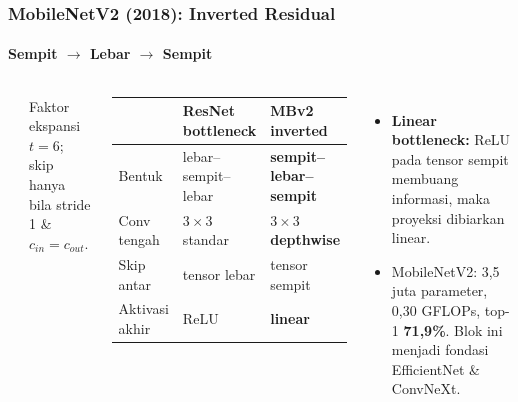 \documentclass[t,aspectratio=169,xcolor=dvipsnames]{beamer}
\begin{document}
\begin{frame}
    \frametitle{MobileNetV2 (2018): Inverted Residual}
    \framesubtitle{Sempit $\to$ Lebar $\to$ Sempit}
    \footnotesize

    \begin{columns}[T]
        \begin{center}
        \end{center}
        {\scriptsize\color{dlMute} Faktor ekspansi $t=6$; skip hanya bila stride 1 \& $c_{in}=c_{out}$.}

        \vspace{2pt}
        \begin{center}
        \scriptsize
        \begin{tabular}{lll}
            \toprule
             & \textbf{ResNet bottleneck} & \textbf{MBv2 inverted} \\
            \midrule
            Bentuk & lebar--sempit--lebar & \textbf{sempit--lebar--sempit} \\
            Conv tengah & $3\times3$ standar & $3\times3$ \textbf{depthwise} \\
            Skip antar & tensor lebar & tensor sempit \\
            Aktivasi akhir & ReLU & \textbf{linear} \\
            \bottomrule
        \end{tabular}
        \end{center}
        \begin{itemize}
            \item \textbf{Linear bottleneck:} ReLU pada tensor sempit membuang informasi, maka proyeksi dibiarkan linear.
            \item MobileNetV2: 3,5 juta parameter, 0,30 GFLOPs, top-1 \textbf{71,9\%}. Blok ini menjadi fondasi EfficientNet \& ConvNeXt.
        \end{itemize}
    \end{columns}
\end{frame}
\end{document}

